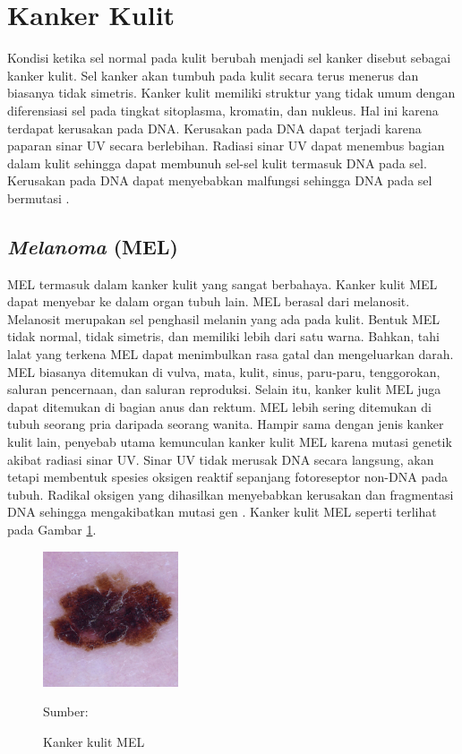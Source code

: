 \section{Kanker Kulit}
Kondisi ketika sel normal pada kulit berubah menjadi sel kanker disebut sebagai kanker kulit. Sel kanker akan tumbuh pada kulit secara terus menerus dan biasanya tidak simetris. Kanker kulit memiliki struktur yang tidak umum dengan diferensiasi sel pada tingkat sitoplasma, kromatin, dan nukleus. Hal ini karena terdapat kerusakan pada DNA. Kerusakan pada DNA dapat terjadi karena paparan sinar UV secara berlebihan. Radiasi sinar UV dapat menembus bagian dalam kulit sehingga dapat membunuh sel-sel kulit termasuk DNA pada sel. Kerusakan pada DNA dapat menyebabkan malfungsi sehingga DNA pada sel bermutasi \citep{Nugroho2019}.

    \subsection{\textit{Melanoma} (MEL)}
    MEL termasuk dalam kanker kulit yang sangat berbahaya. Kanker kulit MEL dapat menyebar ke dalam organ tubuh lain. MEL berasal dari melanosit. Melanosit merupakan sel penghasil melanin yang ada pada kulit. Bentuk MEL tidak normal, tidak simetris, dan memiliki lebih dari satu warna. Bahkan, tahi lalat yang terkena MEL dapat menimbulkan rasa gatal dan mengeluarkan darah. MEL biasanya ditemukan di vulva, mata, kulit, sinus, paru-paru, tenggorokan, saluran pencernaan, dan saluran reproduksi. Selain itu, kanker kulit MEL juga dapat ditemukan di bagian anus dan rektum. MEL lebih sering ditemukan di tubuh seorang pria daripada seorang wanita. Hampir sama dengan jenis kanker kulit lain, penyebab utama kemunculan kanker kulit MEL karena mutasi genetik akibat radiasi sinar UV. Sinar UV tidak merusak DNA secara langsung, akan tetapi membentuk spesies oksigen reaktif sepanjang fotoreseptor non-DNA pada tubuh. Radikal oksigen yang dihasilkan menyebabkan kerusakan dan fragmentasi DNA sehingga mengakibatkan mutasi gen \citep{Sang2019}. Kanker kulit MEL seperti terlihat pada Gambar \ref{fig:mel}.
    \begin{figure}[H] 
        \begin{center} 
            \includegraphics[width=4cm]{../img/Skin Cancer MEL - Latex.jpg}
            \caption{Kanker kulit MEL} 
            \label{fig:mel}
            Sumber: \citep{Codella2018,Combalia2019,Tschandl2018}
        \end{center} 
    \end{figure}

